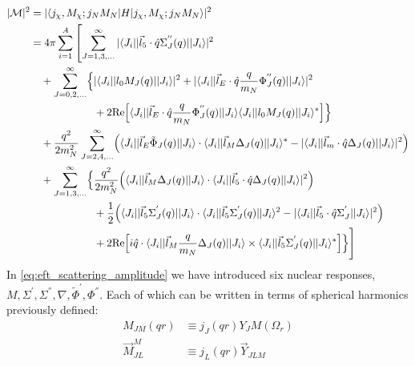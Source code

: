 \begin{equation}
\begin{split}
    | \mathcal{M} |^2  &= |\langle j_\chi,M_\chi;j_N M_N | H | j_\chi,M_\chi;j_N M_N \rangle |^2 \\
    &= 4 \pi \sum_{i=1}^{A} \left[ \sum_{J=1,3,...}^{\infty} | \langle J_i||\vec{l}_5 \cdot \hat{q} \Sigma_{J}^{''}(q) || J_i \rangle |^2 \right. \\
    &\quad+ \sum_{J=0,2,...}^{\infty} \Bigl\{ | \langle J_i||l_0 M_J (q) || J_i \rangle |^2 + | \langle J_i||\vec{l}_E \cdot \hat{q} \frac{q}{m_N} \Phi^{''}_{J} (q) || J_i \rangle |^2 \\
    &\qquad\qquad\qquad+ 2\text{Re} \Bigl[ \langle J_i || \vec{l}_E \cdot \hat{q} \frac{q}{m_N} \Phi^{''}_{J}(q) || J_i\rangle \langle J_i||l_0 M_{J}(q)||J_i\rangle^*\Bigl] \Bigl\} \\
    &\quad+ \frac{q^2}{2m^2_N} \sum_{J=2,4,...}^{\infty} \Bigl( \langle J_i || \vec{l}_E \tilde{\Phi}_{J}(q) || J_i \rangle \cdot \langle J_i || \vec{l}_M \Delta_{J}(q) || J_i \rangle^* - |\langle J_i || \vec{l}_m \cdot \hat{q}\Delta_{J}(q) ||J_i \rangle |^2 \Bigl) \\
    &\quad+ \sum_{J=1,3,...}^{\infty} \Bigl\{ \frac{q^2}{2m^2_N} \Bigl( \langle J_i || \vec{l}_M \Delta_{J}(q) || J_i \rangle \cdot \langle J_i || \vec{l}_5 \cdot \hat{q}\Delta_{J}(q) || J_i \rangle |^2 \Bigl) \\
    &\qquad\qquad\qquad+ \frac{1}{2} \Bigl( \langle J_i|| \vec{l}_5 \Sigma^{'}_{J}(q) || J_i \rangle \cdot \langle J_i||\vec{l}_5 \Sigma^{'}_{J}(q) || J_i \rangle^2 - |\langle J_i||\vec{l}_5 \cdot \hat{q} \Sigma^{'}_{J} || J_i \rangle |^2 \Bigl) \\
    &\qquad\qquad\qquad+ 2\text{Re} \Bigl[ i\hat{q} \cdot \langle J_i || \vec{l}_M \frac{q}{m_N} \Delta_{J}(q) || J_i \rangle  \times \langle J_i||\vec{l}_{5} \Sigma^{'}_{J}(q) || J_i \rangle^* \Bigl] \Bigl\} \Biggr] 
\end{split}
\label{eq:eft_scattering_amplitude}
\end{equation}
In \autoref{eq:eft_scattering_amplitude} we have introduced six nuclear responses, $M,\Sigma^{'},\Sigma^{''},\nabla,\tilde{\Phi}^{'},\Phi^{''}$. 
Each of which can be written in terms of spherical harmonics previously defined:
\begin{equation}
\begin{split}
    M_{JM}(qr) &\equiv j_J(qr)Y_J M(\Omega_r) \\
    \vec{M}^{M}_{JL} &\equiv j_L (qr) \vec{Y}_{JLM}
\end{split}    
\end{equation}
